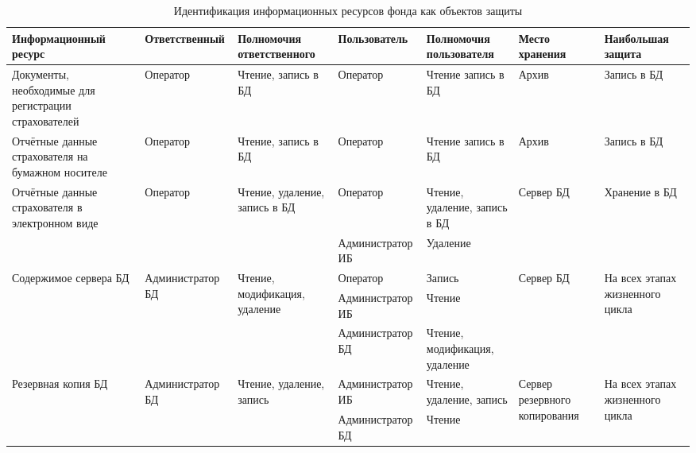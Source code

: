 \newpage


\begin{sidewaystable}[h]
\begin{longtable}{|p{5cm}|p{2.5cm}|p{3cm}|p{3.5cm}|p{2.5cm}|p{2.5cm}|p{2.7cm}|}
\caption{Идентификация информационных ресурсов фонда как объектов
      защиты}
\label{infsource} \\\hline
Информаци\-онный ресурс &
Ответствен\-ный &
Полномочия ответственного  &
Пользователь &
Полномочия пользователя &
Место хранения &
Наибольшая защита
\\\hline

Документы, необходимые для регистрации страхователей &
Оператор &
Чтение, запись в БД &
Оператор &
Чтение запись в БД &
Архив &
Запись в БД \\\hline

Отчётные данные страхователя на бумажном носителе &
Оператор &
Чтение, запись в БД &
Оператор &
Чтение запись в БД &
Архив &
Запись в БД \\\hline

Отчётные данные страхователя в электронном виде &
Оператор &
Чтение, удаление, запись в БД &
Оператор &
Чтение, удаление, запись в БД &
Сервер БД &
Хранение в БД \\\cline{4-5}

&&&
Администратор ИБ &
Удаление && \\\hline

\multirow{2}{5cm}{Содержимое сервера БД} &
\multirow{2}{2.5cm}{Админист\-ратор БД} &
\multirow{2}{3cm}{Чтение, модификация, удаление} &
Оператор &
Запись &
Сервер БД &
\multirow{2}{2.7cm}{На всех этапах жизненного цикла} \\\cline{4-5}

&&&
Администратор ИБ &
Чтение && \\\cline{4-5}

&&&
Администратор БД &
Чтение, модификация, удаление && \\\hline

\multirow{2}{5cm}{Резервная копия БД} &
\multirow{2}{2.5cm}{Админист\-ратор БД} &
\multirow{2}{3cm}{Чтение, удаление, запись} &
Администратор ИБ &
Чтение, удаление, запись &
\multirow{2}{2.5cm}{Сервер резервного копирова\-ния} &
\multirow{2}{2.7cm}{На всех этапах жизненного цикла} \\\cline{4-5}

&&&
Администратор БД &
Чтение && \\\hline
\end{longtable}
\end{sidewaystable}


